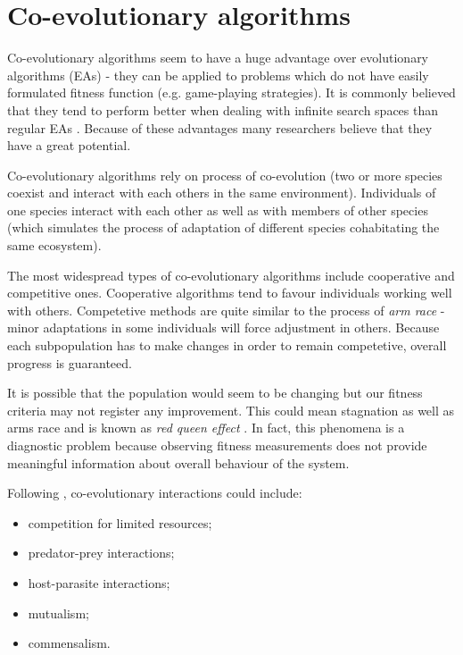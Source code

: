 
\section{Co-evolutionary algorithms}
\label{sec:co-evol}

Co-evolutionary algorithms seem to have a huge advantage over evolutionary algorithms (EAs) - they can be applied to problems which do not have easily formulated 
fitness function (e.g. game-playing strategies).
It is commonly believed that they tend to perform better when dealing with infinite search spaces than regular EAs \cite{co-evol}.
Because of these advantages many researchers believe that they have a great potential.

Co-evolutionary algorithms rely on process of co-evolution (two or more species coexist and interact with each others in the same environment).
Individuals of one species interact with each other as well as with members of other species (which simulates the process of adaptation of different species cohabitating the same 
ecosystem).

The most widespread types of co-evolutionary algorithms include cooperative and competitive ones.
Cooperative algorithms tend to favour individuals working well with others.
Competetive methods are quite similar to the process of \emph{arm race} - minor adaptations in some individuals will force adjustment in others.
Because each subpopulation has to make changes in order to remain competetive, overall progress is guaranteed. 
  
It is possible that the population would seem to be changing but our fitness criteria may not register any improvement.
This could mean stagnation as well as arms race and is known as \emph{red queen effect} \cite{co-evol}.
In fact, this phenomena is a diagnostic problem because observing fitness measurements does not provide meaningful information about overall behaviour of the system.
 


Following \cite{Dre}, co-evolutionary interactions could include:

\begin{itemize}
  \item competition for limited resources;
  \item predator-prey interactions;
  \item host-parasite interactions;
  \item mutualism;
  \item commensalism.
\end{itemize}


